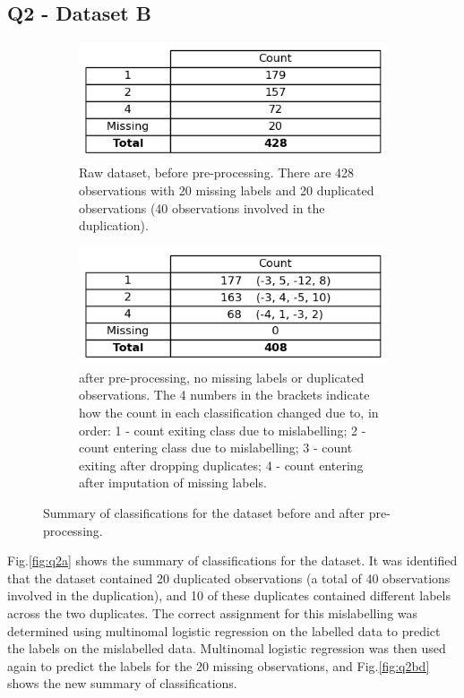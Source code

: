 
\subsection{Q2 - Dataset B}\label{subsec:dataset-b}
    \begin{figure}
    \centering
    \begin{subfigure}{0.9\textwidth}
      \centering
      \includegraphics[width=.55\linewidth]{./figures/q2a}
      \caption{Raw  dataset, before pre-processing. There are 428 observations with 20 missing
        labels and 20 duplicated observations (40 observations involved in the duplication).}
      \label{fig:q2a}
    \end{subfigure}%
    \hfill
    \begin{subfigure}{0.9\textwidth}
      \centering
      \includegraphics[width=0.55\linewidth]{./figures/q2b_q2d}
      \caption{ after pre-processing, no missing labels or duplicated observations.
        The 4 numbers in the brackets indicate how the count in each classification changed due to, in order: 1 -
        count exiting class due to mislabelling; 2 - count entering class due to mislabelling; 3 - count exiting
        after dropping duplicates; 4 - count entering after imputation of missing labels.}
      \label{fig:q2bd}
    \end{subfigure}
    \caption{Summary of classifications for the  dataset before and after pre-processing.}
    \label{fig:q2abd}
    \end{figure}

    Fig.\eqref{fig:q2a} shows the summary of classifications for the  dataset.
    It was identified that the dataset contained 20 duplicated observations (a total of 40 observations involved in the
    duplication), and 10 of these duplicates contained different labels across the two duplicates.
    The correct assignment for this mislabelling was determined using multinomal logistic regression on the labelled data
    to predict the labels on the mislabelled data.
    Multinomal logistic regression was then used again to predict the labels for the 20 missing observations, and
    Fig.\eqref{fig:q2bd} shows the new summary of classifications.

